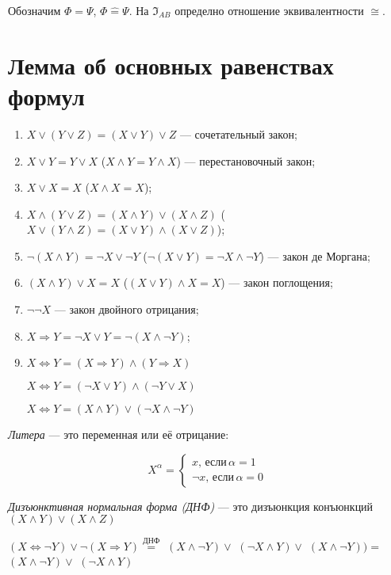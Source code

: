 Обозначим $\Phi = \Psi$, $\Phi \hat{=} \Psi$. На $\mathfrak{I}_{AB}$ определно отношение эквивалентности $\cong$.

\section{Лемма об основных равенствах формул}

\begin{enumerate}
    \item $X \lor (Y \lor Z) = (X \lor Y) \lor Z$ --- сочетательный закон;
    \item $X \lor Y = Y \lor X$ ($X \land Y = Y \land X$) --- перестановочный закон;
    \item $X \lor X = X$ ($X \land X = X$);
    \item $X \land (Y \lor Z) = (X \land Y) \lor (X \land Z)$ ($X \lor (Y \land Z) = (X \lor Y) \land (X \lor Z)$);
    \item $\lnot(X \land Y) = \lnot X \lor \lnot Y$ ($\lnot(X \lor Y) = \lnot X \land \lnot Y$) --- закон де Моргана;
    \item $(X \land Y) \lor X = X$ ($(X \lor Y) \land X = X$) --- закон поглощения;
    \item $\lnot \lnot X$ --- закон двойного отрицания;
    \item $X \Rightarrow Y = \lnot X \lor Y = \lnot(X \land \lnot Y)$;
    \item $X \Leftrightarrow Y = (X \Rightarrow Y) \land (Y \Rightarrow X)$
    
    $X \Leftrightarrow Y = (\lnot X \lor Y) \land (\lnot Y \lor X)$

    $X \Leftrightarrow Y = (X \land Y) \lor (\lnot X \land \lnot Y)$
\end{enumerate}

\dftion \textit{Литера} --- это переменная или её отрицание:

\begin{equation*}
    X^\alpha = 
        \left\{ \begin{aligned}
        x, \, \text{если} \, \alpha = 1 \\
        \lnot x, \, \text{если} \, \alpha = 0
        \end{aligned} \right.
\end{equation*}

\dftion \textit{Дизъюнктивная нормальная форма (ДНФ)} --- это дизъюнкция конъюнкций $(X \land Y) \lor (X \land Z)$

\ex $(X \Leftrightarrow \lnot Y) \lor \lnot (X \Rightarrow Y) \overset {\text{ДНФ}}{=}$ $(X \land \lnot Y) \lor$ $(\lnot X \land Y) \lor$ $(X \land \lnot Y)) =$ $(X \land \lnot Y) \lor$ $(\lnot X \land Y)$

